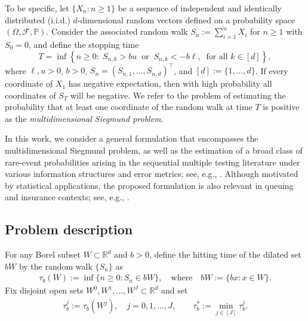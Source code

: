 \documentclass[aap,preprint]{imsart}
\theoremstyle{plain}
\theoremstyle{definition}
\begin{document}
To be specific, let $\{X_n : n \geq 1\}$ be a sequence of independent and identically distributed (i.i.d.) $d$-dimensional random vectors defined on a probability space $(\Omega, \mathcal{F}, \mathbb{P})$. Consider the associated random walk
$S_n := \sum_{i=1}^n X_i$ for $n \geq 1$ with $S_0 = 0$, and define the stopping time
\begin{equation} \label{def:siemund_stopping}
T = \inf\left\{ n \geq 0 : \; S_{n,k} > b u \;\; \text{or} \;\; S_{n,k} < - b \ell, \;\; \text{for all } k \in [d] \right\},
\end{equation}
where $\ell, u > 0$, $b > 0$, $S_n = (S_{n,1}, \ldots, S_{n,d})^\top$, and $[d] := \{1,\ldots,d\}$. If every coordinate of $X_1$ has negative expectation, then with high probability all coordinates of $S_T$ will be negative. We refer to the problem of estimating the probability that at least one coordinate of the random walk at time $T$ is positive as the \textit{multidimensional Siegmund problem}.


In this work, we consider a general formulation that encompasses the multidimensional Siegmund problem, as well as the estimation of a broad class of rare-event probabilities arising in the sequential multiple testing literature under various information structures and error metrics; see, e.g., \cite{de2012sequential,de2012step,song2017asymptotically,song2019sequential,he2021asymptotically}. Although motivated by statistical applications, the proposed formulation is also relevant in queuing and insurance contexts; see, e.g., \cite{alma9917764973405158,glasserman2004monte,hult2006heavy}.


\subsection{Problem description}
For any Borel subset $W \subset \mathbb{R}^d$ and $b > 0$, define the hitting time of the dilated set $bW$ by the random walk $\{S_n\}$ as
\begin{align}
    \label{def:hitting_time}
    \tau_b(W) := \inf\{n \geq 0 : S_n \in bW\}, 
   \quad \text{where}  \quad  bW := \{b x : x \in W\}.
\end{align}
Fix disjoint open sets $W^{0}, W^{1}, \ldots, W^{J} \subset \mathbb{R}^d$ and set
\begin{align}\label{def:hitting_W_js} 
    \tau_b^j := \tau_b(W^j), \quad j=0,1,\ldots,J, 
    \qquad \tau_b^{*} := \min_{j \in [J]} \tau_b^j.
\end{align}
\end{document}

